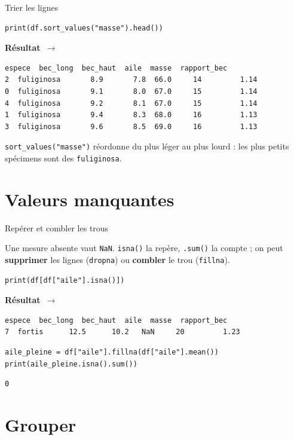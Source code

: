 \documentclass[aspectratio=169,11pt]{beamer}
\newcommand{\resultat}{{\scriptsize\textbf{R\'esultat}~$\rightarrow$}\par\vspace{1pt}}
\begin{document}
\begin{frame}[fragile]{Trier les lignes}
\begin{lstlisting}
print(df.sort_values("masse").head())
\end{lstlisting}
\resultat
\begin{lstlisting}[style=out]
       espece  bec_long  bec_haut  aile  masse  rapport_bec
2  fuliginosa       8.9       7.8  66.0     14         1.14
0  fuliginosa       9.1       8.0  67.0     15         1.14
4  fuliginosa       9.2       8.1  67.0     15         1.14
1  fuliginosa       9.4       8.3  68.0     16         1.13
3  fuliginosa       9.6       8.5  69.0     16         1.13
\end{lstlisting}
{\small \texttt{sort\_values("masse")} réordonne du plus léger au plus lourd : les plus petits spécimens sont des \texttt{fuliginosa}.}
\end{frame}

\section{Valeurs manquantes}

\begin{frame}[fragile]{Repérer et combler les trous}
\begin{ucaddef}
{\small Une mesure absente vaut \texttt{NaN}. \texttt{isna()} la repère, \texttt{.sum()} la compte ; on peut \textbf{supprimer} les lignes (\texttt{dropna}) ou \textbf{combler} le trou (\texttt{fillna}).}
\end{ucaddef}
\begin{lstlisting}
print(df[df["aile"].isna()])
\end{lstlisting}
\resultat
\begin{lstlisting}[style=out]
   espece  bec_long  bec_haut  aile  masse  rapport_bec
7  fortis      12.5      10.2   NaN     20         1.23
\end{lstlisting}
\begin{lstlisting}
aile_pleine = df["aile"].fillna(df["aile"].mean())
print(aile_pleine.isna().sum())
\end{lstlisting}
\begin{lstlisting}[style=out]
0
\end{lstlisting}
\end{frame}

\section{Grouper}
\end{document}
